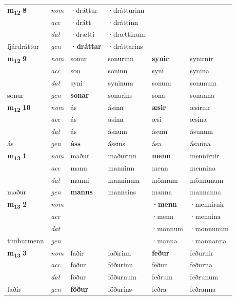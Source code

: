 \begin{longtable}[l]{X>{\footnotesize\itshape}XXXXX}
\multirow{3}{*}{{{\textbf{m{\textsubscript{12}}} \Large{\textbf{8}}}}}  
 & nom & ·dráttur & ·drátturinn    & \textbf{} &   \\*
 & acc & ·drátt  & ·dráttinn   &   &  \\*
 & dat & ·drætti & ·drættinum   &  &  \\*
 {\footnotesize{fjárdráttur}} &  gen & \textbf{·dráttar}  & ·dráttarins  &  &  \\
\cmidrule{1-6}


\multirow{3}{*}{{{\textbf{m{\textsubscript{12}}} \Large{\textbf{9}}}}}  
 & nom & sonur & sonurinn    & \textbf{synir} & synirnir  \\*
 & acc & son  & soninn   & syni  & synina \\*
 & dat & syni & syninum   & sonum & sonunum \\*
 {\footnotesize{sonur}} &  gen & \textbf{sonar}  & sonarins  & sona & sonanna \\
\cmidrule{1-6}


\multirow{3}{*}{{{\textbf{m{\textsubscript{12}}} \Large{\textbf{10}}}}}  
 & nom & ás & ásinn    & \textbf{æsir} & æsirnir  \\*
 & acc & ás  & ásinn   & æsi  & æsina \\*
 & dat & ás & ásnum   & ásum & ásunum \\*
 {\footnotesize{ás}} &  gen & \textbf{áss}  & ássins  & ása & ásanna \\
\cmidrule{1-6}


\multirow{3}{*}{{{\textbf{m{\textsubscript{13}}} \Large{\textbf{1}}}}}  
 & nom & maður & maðurinn    & \textbf{menn} & mennirnir  \\*
 & acc & mann  & manninn   & menn  & mennina \\*
 & dat & manni & manninum   & mönnum & mönnunum \\*
 {\footnotesize{maður}} &  gen & \textbf{manns}  & mannsins  & manna & mannanna \\
\cmidrule{1-6}


\multirow{3}{*}{{{\textbf{m{\textsubscript{13}}} \Large{\textbf{2}}}}}  
 & nom &  &     & \textbf{·menn} & ·mennirnir  \\*
 & acc &   &    & ·menn  & ·mennina \\*
 & dat &  &    & ·mönnum & ·mönnunum \\*
 {\footnotesize{timburmenn}} &  gen & \textbf{}  &   & ·manna & ·mannanna \\
\cmidrule{1-6}


\multirow{3}{*}{{{\textbf{m{\textsubscript{13}}} \Large{\textbf{3}}}}}  
 & nom & faðir & faðirinn    & \textbf{feður} & feðurnir  \\*
 & acc & föður  & föðurinn   & feður  & feðurna \\*
 & dat & föður & föðurnum   & feðrum & feðrunum \\*
 {\footnotesize{faðir}} &  gen & \textbf{föður}  & föðurins  & feðra & feðranna \\
\cmidrule{1-6}



\end{longtable}

